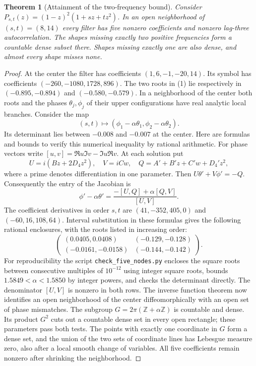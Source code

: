 \documentclass[11pt,letterpaper]{article}
\newtheorem{theorem}{Theorem}
\begin{document}
\begin{theorem}[Attainment of the two-frequency bound]\label{thm:two}
Consider $P_{s,t}(z)=(1-z)^2(1+sz+tz^2)$. In an open neighborhood of $(s,t)=(8,14)$ every filter has five nonzero coefficients and nonzero lag-three autocorrelation. The shapes missing exactly two positive frequencies form a countable dense subset there. Shapes missing exactly one are also dense, and almost every shape misses none.
\end{theorem}
\begin{proof}
At the center the filter has coefficients $(1,6,-1,-20,14)$. Its symbol has coefficients $(-260,-1080,1728,896)$. The two roots in (1) lie respectively in $(-0.895,-0.894)$ and $(-0.580,-0.579)$. In a neighborhood of the center both roots and the phases $\theta_j,\phi_j$ of their upper configurations have real analytic local branches. Consider the map
\[
 (s,t)\longmapsto(\phi_1-\alpha\theta_1,\phi_2-\alpha\theta_2).
\]
Its determinant lies between $-0.008$ and $-0.007$ at the center. Here are formulas and bounds to verify this numerical inequality by rational arithmetic. For phase vectors write $[u,v]=\Re u\Im v-\Im u\Re v$. At each solution put
\[
 U=i(Bz+2D_4z^2),\quad V=iCw,\quad
 Q=A'+B'z+C'w+D_4'z^2,
\]
where a prime denotes differentiation in one parameter. Then $U\theta'+V\phi'=-Q$. Consequently the entry of the Jacobian is
\[
 \phi'-\alpha\theta'=\frac{-[U,Q]+\alpha[Q,V]}{[U,V]}.
\]
The coefficient derivatives in order $s,t$ are $(41,-352,405,0)$ and $(-60,16,108,64)$. Interval substitution in these formulas gives the following rational enclosures, with the roots listed in increasing order:
\[
 \begin{pmatrix}
 (0.0405,0.0408)&(-0.129,-0.128)\\
 (-0.0161,-0.0158)&(-0.144,-0.142)
 \end{pmatrix}.
\]
For reproducibility the script \texttt{check\_five\_nodes.py} encloses the square roots between consecutive multiples of $10^{-12}$ using integer square roots, bounds $1.5849<\alpha<1.5850$ by integer powers, and checks the determinant directly. The denominator $[U,V]$ is nonzero in both rows.
The inverse function theorem now identifies an open neighborhood of the center diffeomorphically with an open set of phase mismatches. The subgroup $G=2\pi(\mathbb Z+\alpha\mathbb Z)$ is countable and dense. Its product $G^2$ cuts out a countable dense set in every open rectangle; these parameters pass both tests. The points with exactly one coordinate in $G$ form a dense set, and the union of the two sets of coordinate lines has Lebesgue measure zero, also after a local smooth change of variables. All five coefficients remain nonzero after shrinking the neighborhood.
\end{proof}
\end{document}
